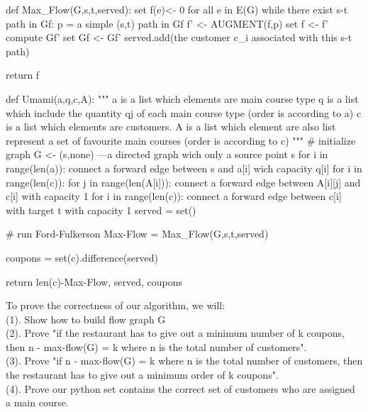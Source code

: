 \documentclass{assignment-373}
\begin{document}
\begin{enumerate}
\begin{python}
    def Max_Flow(G,s,t,served):
        set f(e)<- 0 for all e in E(G)
        while there exist s-t path in Gf:
            p = a simple (s,t) path in Gf
            f' <- AUGMENT(f,p)
            set f <- f'
            compute Gf'
            set Gf <- Gf'
            served.add(the customer c_i associated with this s-t path)
            
        return f
    
    
    def Umami(a,q,c,A):
    """
    a is a list which elements are main course type
    q is a list which include the quantity qj of each main course type (order is according to a)
    c is a list which elements are customers.
    A is a list which element are also list represent a set of favourite main courses (order is according to c)
    """
    # initialize graph
    G <- (s,none) ---a directed graph wich only a source point s
    for i in range(len(a)):
        connect a forward edge between s and a[i] wich capacity q[i]
    for i in range(len(c)):
        for j in range(len(A[i])):
            connect a forward edge between A[i][j] and c[i] with capacity 1
    for i in range(len(c)):
        connect a forward edge between c[i] with target t with capacity 1
    served = set()
    
    # run Ford-Fulkerson
    Max-Flow =  Max_Flow(G,s,t,served)
    
    coupons = set(c).difference(served)
    
    
    return len(c)-Max-Flow, served, coupons
    \end{python}
    
     \phantom{=} \phantom{=} To prove the correctness of our algorithm, we will:\\
      \phantom{=} \phantom{=}  (1). Show how to build flow graph G\\
       \phantom{=} \phantom{=}  (2). Prove "if the restaurant has to give out a minimum number of k coupons, then n - max-flow(G) = k where n is the total number of customers".\\
        \phantom{=} \phantom{=} (3). Prove "if n - max-flow(G) = k where n is the total number of customers, then the restaurant has to give out a minimum order of k coupons".\\
         \phantom{=} \phantom{=} (4). Prove our python set contains the correct set of customers who are assigned a main course.\\
        

\end{enumerate}
\end{document}
